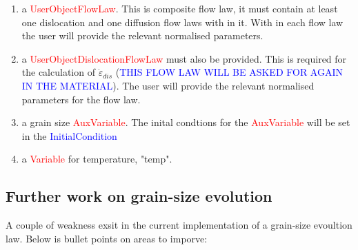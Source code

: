 \documentclass[]{scrreprt}
\begin{document}
\begin{enumerate} 

\item a \textcolor{red}{UserObjectFlowLaw}. This is composite flow law, it must contain at least one dislocation and one diffusion flow laws with in it. With in each flow law the user will provide the relevant normalised parameters.
\item a \textcolor{red}{UserObjectDislocationFlowLaw} must also be provided. This is required for the calculation of $\dot{\varepsilon}_{dis}$ (\textcolor{blue}{THIS FLOW LAW WILL BE ASKED FOR AGAIN IN THE MATERIAL}). The user will provide the relevant normalised parameters for the flow law.  
\item a grain size \textcolor{red}{AuxVariable}. The inital condtions for the \textcolor{red}{AuxVariable} will be set in the \textcolor{blue}{InitialCondition}
\item a \textcolor{red}{Variable} for temperature, "temp". 


\end{enumerate}

\subsection{Further work on grain-size evolution}
\label{subsection:further_work}

A couple of weakness exsit in the current implementation of a grain-size evoultion law. Below is bullet points on areas to imporve:
\end{document}
